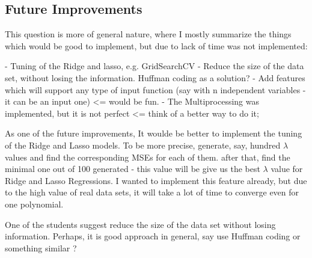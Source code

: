  \subsection{Future Improvements}
 
 This question is more of general nature, where I mostly summarize the things which would be good to implement, but due to lack of time was not implemented:
 
 - Tuning of the Ridge and lasso, e.g. GridSearchCV
 - Reduce the size of the data set, without losing the information. Huffman coding as a solution?
 - Add features which will support any type of input function (say with n independent variables - it can be an input one) <= would be fun.
 - The Multiprocessing was implemented, but it is not perfect <= think of a better way to do it;
 
 As one of the future improvements, It woulde be better to implement the tuning of the Ridge and Lasso models. To be more precise, generate, say, hundred $\lambda$ values and find the corresponding MSEs for each of them. after that, find the minimal one out of 100 generated - this value will be give us the best $\lambda$ value for Ridge and Lasso Regressions. I wanted to implement this feature already, but due to the high value of real data sets, it will take a lot of time to converge even for one polynomial. 
 
 One of the students suggest reduce the size of the data set without losing information. Perhaps, it is good approach in general, say use Huffman coding or something similar ?

